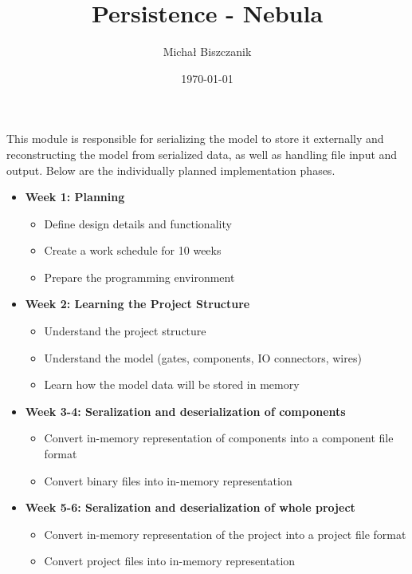 \documentclass[12pt,a4paper]{article}
\title{Persistence - Nebula}
\author{Michał Biszczanik}
\date{\today}
\begin{document}
\maketitle

This module is responsible for serializing the model to store it externally and reconstructing the model from serialized data, as well as handling file input and output. Below are the individually planned implementation phases.

\begin{itemize}

\item \textbf{Week 1: Planning}
    \begin{itemize}
        \item Define design details and functionality
        \item Create a work schedule for 10 weeks
        \item Prepare the programming environment
    \end{itemize}

\item \textbf{Week 2: Learning the Project Structure}
    \begin{itemize}
        \item Understand the project structure
        \item Understand the model (gates, components, IO connectors, wires)
        \item Learn how the model data will be stored in memory
    \end{itemize}

\item \textbf{Week 3-4: Seralization and deserialization of components}
    \begin{itemize}
        \item Convert in-memory representation of components into a component file format
        \item Convert binary files into in-memory representation
    \end{itemize}
    
    \item \textbf{Week 5-6: Seralization and deserialization of whole project}
    \begin{itemize}
        \item Convert in-memory representation of the project into a project file format
        \item Convert project files into in-memory representation
    \end{itemize}
    

\end{itemize}
\end{document}
